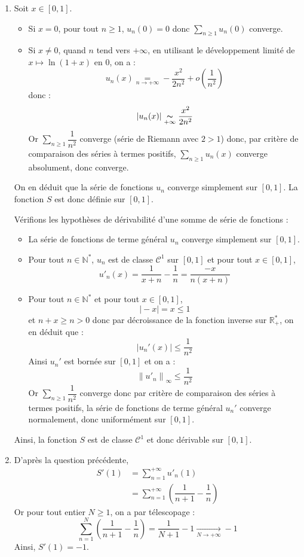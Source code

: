 \documentclass[a4paper,twoside,french,11pt]{VcCours}
\newcommand{\Sum}[2]{\sum_{#1}^{#2}}
\begin{document}
\begin{enumerate}
\item Soit $x \in \left[ {0,1} \right]$.
\begin{itemize}
\item Si $x=0$, pour tout $n \geq 1$, $u_n(0)=0$ donc $\Sum{n\geq 1}{} u_n(0)$ converge.
\item Si $x\neq 0$, quand $n$ tend vers $ + \infty $, en utilisant le développement limité de $x \mapsto \ln(1+x)$ en $0$, on a :
$$u_n (x) \underset{n \rightarrow + \infty}{=}  - \dfrac{{x^2 }}{2{n^2 }} + o\left( {\dfrac{1}{{n^2 }}} \right)$$
donc :
$$|u_n(x)|\underset{+\infty}{\thicksim}\dfrac{x^2 }{2n^2 }$$
Or  $\Sum{n\geq 1}{} \dfrac{1}{n^2}$ converge (série de Riemann avec $2>1$) donc, par critère de comparaison des séries à termes positifs, $\Sum{n\geq 1}{} u_n(x)$ converge absolument, donc converge.
\end{itemize}
On en déduit que la série de fonctions $u_n $ converge simplement sur $\left[ {0,1} \right]$. La fonction $S$ est donc définie sur $\left[ {0,1} \right]$.

\bigskip

Vérifions les hypothèses de dérivabilité d'une somme de série de fonctions :
\begin{itemize}
\item La série de fonctions de terme général $u_n$ converge simplement sur $[0,1]$.
\item Pour tout $n \in \mathbb{N}^*$, $u_n $ est de  classe $\mathcal{C}^1 $ sur $\left[ {0,1} \right]$ et pour tout $x \in [0,1]$,
$$u'_n (x) = \dfrac{1}{{x + n}} - \dfrac{1}{n} = \dfrac{{ - x}}{{n(x + n)}}$$
\item Pour tout $n\in\mathbb{N}^*$ et pour tout $x\in\left[ {0,1} \right]$,
$$\vert -x \vert = x \leq 1$$
et $n+x \geq n>0$ donc par décroissance de la fonction inverse sur $\mathbb{R}_+^*$, on en déduit que :
$$|u_n'(x)|\leq \dfrac{1}{n^2}$$
Ainsi $u_n'$ est bornée sur $[0,1]$ et on a :
$$\left\| {u'_n } \right\|_\infty   \leq \dfrac{1}{{n^2 }}$$
Or $\Sum{n\geq 1}{} \dfrac{1}{n^2}$ converge donc par critère de comparaison des séries à termes positifs, la série de fonctions de terme général $u_n'$ converge normalement, donc uniformément sur $\left[ {0,1} \right]$.
\end{itemize}
Ainsi, la fonction $S$ est de classe $\mathcal{C}^1$ et donc dérivable sur $[0,1]$. 
\item D'après la question précédente,
\begin{align*}
S'(1) & = \sum\limits_{n = 1}^{ + \infty } {u'_n (1)} \\
&   =\sum\limits_{n = 1}^{ + \infty } {\left( {\dfrac{1}{{n + 1}} - \dfrac{1}{n}} \right)} 
\end{align*}
Or pour tout entier $N \geq 1$, on a par télescopage :
$$\sum\limits_{n = 1}^N {\left( {\dfrac{1}{{n + 1}} - \dfrac{1}{n}} \right)}  = \dfrac{1}{{N + 1}} - 1\xrightarrow[{N \to  + \infty }]{} -1$$
Ainsi, $S'(1) =-1$.
\end{enumerate}
\end{document}
